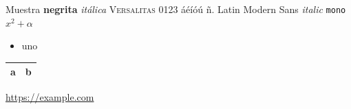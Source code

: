 \documentclass[11pt,a4paper]{article}
\begin{document}
Muestra \textbf{negrita} \textit{itálica} \textsc{Versalitas} 0123 áéíóú ñ.
{Latin Modern Sans \textit{italic}} \texttt{mono}
\faEnvelope{} \faGithub{} \faLinkedin{} \faPhone{}
$x^2 + \alpha$
\begin{itemize}[leftmargin=*]\item uno\end{itemize}
\begin{tabularx}{\linewidth}{lX}\toprule a & b\\\bottomrule\end{tabularx}
\url{https://example.com}
\end{document}
